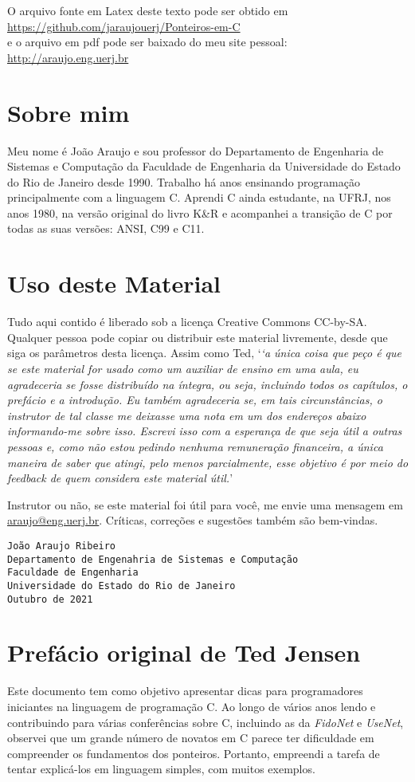 O arquivo fonte em Latex deste texto pode ser obtido em\\ \url{https://github.com/jaraujouerj/Ponteiros-em-C}\\
e o arquivo em pdf pode ser baixado do meu site pessoal:\\
\url{http://araujo.eng.uerj.br}

\section*{Sobre mim}
Meu nome é João Araujo e sou professor do Departamento de Engenharia de Sistemas e Computação da Faculdade de Engenharia da Universidade do Estado do Rio de Janeiro desde 1990. Trabalho há anos ensinando programação principalmente com a linguagem C. Aprendi C ainda estudante, na UFRJ, nos anos 1980, na versão original do livro K\&R e acompanhei a transição de C por todas as suas versões: ANSI, C99 e C11.

\section*{Uso deste Material}
Tudo aqui contido é liberado sob a licença Creative Commons CC-by-SA. Qualquer pessoa pode copiar ou distribuir este material livremente, desde que siga os parâmetros desta licença. Assim como Ted, `\textit{`a única coisa que peço é que se este material for usado como um auxiliar de ensino em uma aula, eu agradeceria se fosse distribuído na íntegra, ou seja, incluindo todos os capítulos, o prefácio e a introdução. Eu também agradeceria se, em tais circunstâncias, o instrutor de tal classe me deixasse uma nota em um dos endereços abaixo informando-me sobre isso. Escrevi isso com a esperança de que seja útil a outras pessoas e, como não estou pedindo nenhuma remuneração financeira, a única maneira de saber que atingi, pelo menos parcialmente, esse objetivo é por meio do feedback de quem considera este material útil.}'

Instrutor ou não, se este material foi útil para você, me envie uma mensagem em \href{mailto:araujo@eng.uerj.br}{araujo@eng.uerj.br}. Críticas, correções e sugestões também são bem-vindas.

\begin{verbatim}
João Araujo Ribeiro
Departamento de Engenahria de Sistemas e Computação
Faculdade de Engenharia
Universidade do Estado do Rio de Janeiro
Outubro de 2021
\end{verbatim}

\section*{Prefácio original de Ted Jensen}
Este documento tem como objetivo apresentar dicas para programadores iniciantes na linguagem de programação C. Ao longo de vários anos lendo e contribuindo para várias conferências sobre C, incluindo as da \textit{FidoNet} e \textit{UseNet}, observei que um grande número de novatos em C parece ter dificuldade em compreender os fundamentos dos ponteiros. Portanto, empreendi a tarefa de tentar explicá-los em linguagem simples, com muitos exemplos.

